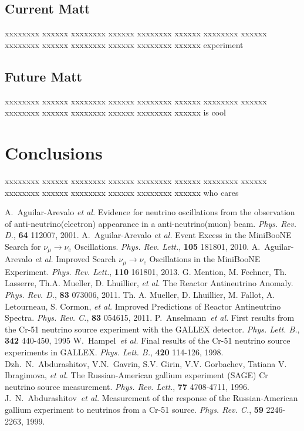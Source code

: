 \documentclass[aps,prd,twocolumn,nofootinbib]{revtex4-1}
\begin{document}
\subsection{Current Matt}
xxxxxxxx xxxxxx xxxxxxxx xxxxxx xxxxxxxx xxxxxx xxxxxxxx xxxxxx xxxxxxxx xxxxxx xxxxxxxx xxxxxx xxxxxxxx xxxxxx
experiment
\subsection{Future Matt}
xxxxxxxx xxxxxx xxxxxxxx xxxxxx xxxxxxxx xxxxxx xxxxxxxx xxxxxx xxxxxxxx xxxxxx xxxxxxxx xxxxxx xxxxxxxx xxxxxx
is cool

\section{Conclusions}
xxxxxxxx xxxxxx xxxxxxxx xxxxxx xxxxxxxx xxxxxx xxxxxxxx xxxxxx xxxxxxxx xxxxxx xxxxxxxx xxxxxx xxxxxxxx xxxxxx
who cares

\begin{thebibliography}{9}
  A.~Aguilar-Arevalo \emph{et al.} Evidence for neutrino oscillations from the observation of anti-neutrino(electron) appearance in a anti-neutrino(muon) beam. \emph{Phys. Rev. D.}, {\bf 64} 112007, 2001.
  A.~Aguilar-Arevalo \emph{et al.} Event Excess in the MiniBooNE Search for $\nu_\mu \rightarrow \nu_e$ Oscillations. \emph{Phys. Rev. Lett.}, {\bf 105} 181801, 2010.
  A.~Aguilar-Arevalo \emph{et al.} Improved Search $\nu_\mu \rightarrow \nu_e$ Oscillations in the MiniBooNE Experiment. \emph{Phys. Rev. Lett.}, {\bf 110} 161801, 2013.
  G. Mention, M. Fechner, Th. Lasserre, Th.A. Mueller, D. Lhuillier, \emph{et al.} The Reactor Antineutrino Anomaly. \emph{Phys. Rev. D.}, {\bf 83} 073006, 2011.
  Th. A. Mueller, D. Lhuillier, M. Fallot, A. Letourneau, S. Cormon, \emph{et al.} Improved Predictions of Reactor Antineutrino Spectra. \emph{Phys. Rev. C.}, {\bf 83} 054615, 2011.
  P.~Anselmann~\emph{et al.} First results from the Cr-51 neutrino source experiment with the GALLEX detector. \emph{Phys. Lett. B.}, {\bf 342} 440-450, 1995
  W.~Hampel~\emph{et al.} Final results of the Cr-51 neutrino source experiments in GALLEX. \emph{Phys. Lett. B.}, {\bf 420} 114-126, 1998.
  Dzh.~N.~Abdurashitov, V.N.~Gavrin, S.V. Girin, V.V. Gorbachev, Tatiana V. Ibragimova, \emph{et al.} The Russian-American gallium experiment (SAGE) Cr neutrino source measurement. \emph{Phys. Rev. Lett.}, {\bf 77} 4708-4711, 1996.
  J.~N.~Abdurashitov~\emph{et al.} Measurement of the response of the Russian-American gallium experiment to neutrinos from a Cr-51 source. \emph{Phys. Rev. C.}, {\bf 59} 2246-2263, 1999.

\end{thebibliography}
\end{document}
